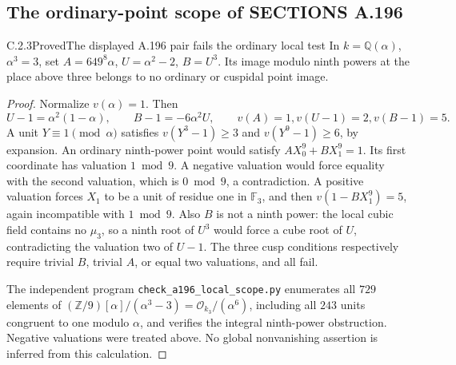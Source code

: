 \subsection{The ordinary-point scope of SECTIONS A.196}
\begin{result}{C.2.3}{Proved}{The displayed A.196 pair fails the ordinary local test}
\label{prop:ghost-a196-scope}
In \(k=\mathbb Q(\alpha)\), \(\alpha^3=3\), set
\(A=649^8\alpha\), \(U=\alpha^2-2\), \(B=U^3\).
Its image modulo ninth powers at the place above three belongs
to no ordinary or cuspidal point image.
\end{result}
\begin{proof}
Normalize \(v(\alpha)=1\). Then
\[
 U-1=\alpha^2(1-\alpha),\qquad B-1=-6\alpha^2U,
 \qquad v(A)=1, v(U-1)=2, v(B-1)=5.
\]
A unit \(Y\equiv1\pmod\alpha\) satisfies
\(v(Y^3-1)\ge3\) and \(v(Y^9-1)\ge6\), by expansion.
An ordinary ninth-power point would satisfy
\(AX_0^9+BX_1^9=1\). Its first coordinate has valuation
\(1\bmod9\). A negative valuation would force equality with
the second valuation, which is \(0\bmod9\), a contradiction.
A positive valuation forces \(X_1\) to be a unit of residue one
in \(\mathbb F_3\), and then
\(v(1-BX_1^9)=5\), again incompatible with \(1\bmod9\).
Also \(B\) is not a ninth power: the local cubic field contains
no \(\mu_3\), so a ninth root of \(U^3\) would force a cube
root of \(U\), contradicting the valuation two of \(U-1\).
The three cusp conditions respectively require trivial \(B\),
trivial \(A\), or equal two valuations, and all fail.

The independent program \texttt{check\_a196\_local\_scope.py}
enumerates all \(729\) elements of
\((\mathbb Z/9)[\alpha]/(\alpha^3-3)
=\mathcal O_{k_3}/(\alpha^6)\), including all \(243\) units
congruent to one modulo \(\alpha\), and verifies the integral
ninth-power obstruction. Negative valuations were treated above.
No global nonvanishing assertion is inferred from this calculation.
\end{proof}
